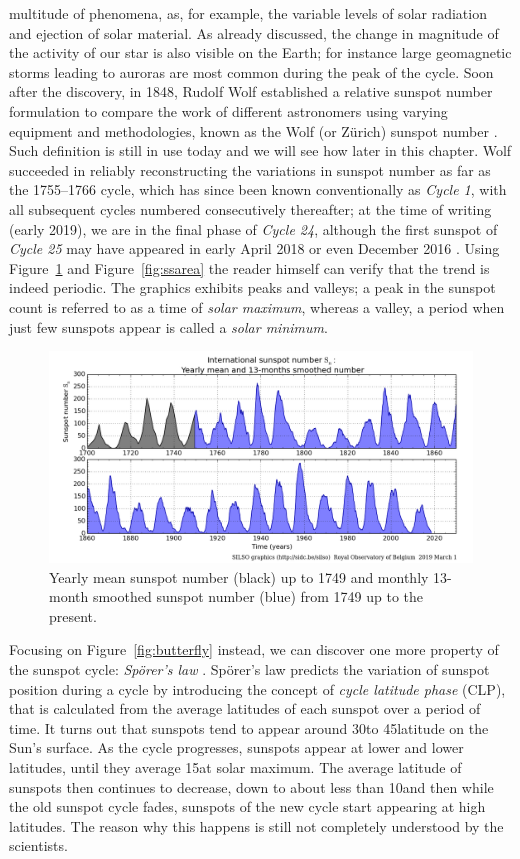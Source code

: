 multitude of phenomena, as, for example, the variable levels of solar radiation and ejection of solar material. As already discussed, the change in magnitude of the activity of our star is also visible on the Earth; for instance large geomagnetic storms leading to auroras are most common during the peak of the cycle. Soon after the discovery, in 1848, Rudolf Wolf established a relative sunspot number formulation to compare the work of different astronomers using varying equipment and methodologies, known as the Wolf (or Z\"{u}rich) sunspot number \cite{vaquero2007historical}. Such definition is still in use today and we will see how later in this chapter. Wolf succeeded in reliably reconstructing the variations in sunspot number as far as the 1755--1766 cycle, which has since been known conventionally as \textit{Cycle 1}, with all subsequent cycles numbered consecutively thereafter; at the time of writing (early 2019), we are in the final phase of \textit{Cycle 24}, although the first sunspot of \textit{Cycle 25} may have appeared in early April 2018 \cite{cycle25-1}\cite{cycle25-2} or even December 2016 \cite{cycle25-3}. Using Figure~\ref{fig:SILSO2} and Figure~\ref{fig:ssarea} the reader himself can verify that the trend is indeed periodic. The graphics exhibits peaks and valleys; a peak in the sunspot count is referred to as a time of \textit{solar maximum}, whereas a valley, a period when just few sunspots appear is called a \textit{solar minimum}.
\begin{figure}[t]
    \centering
    \includegraphics[width=\textwidth]{./pictures/SILSO2}
    \caption{Yearly mean sunspot number (black) up to 1749 and monthly 13-month smoothed sunspot number (blue) from 1749 up to the present.\cite{silso-graph}}
    \label{fig:SILSO2}
\end{figure}
Focusing on Figure~\ref{fig:butterfly} instead, we can discover one more property of the sunspot cycle: \textit{Sp\"{o}rer's law} \cite{ivanov2014sporer}. Sp\"{o}rer's law predicts the variation of sunspot position during a cycle by introducing the concept of \textit{cycle latitude phase} (CLP), that is calculated from the average latitudes of each sunspot over a period of time. It turns out that sunspots tend to appear around 30\degree  to 45\degree  latitude on the Sun's surface. As the cycle progresses, sunspots appear at lower and lower latitudes, until they average 15\degree  at solar maximum. The average latitude of sunspots then continues to decrease, down to about less than 10\degree  and then while the old sunspot cycle fades, sunspots of the new cycle start appearing at high latitudes. The reason why this happens is still not completely understood by the scientists.
